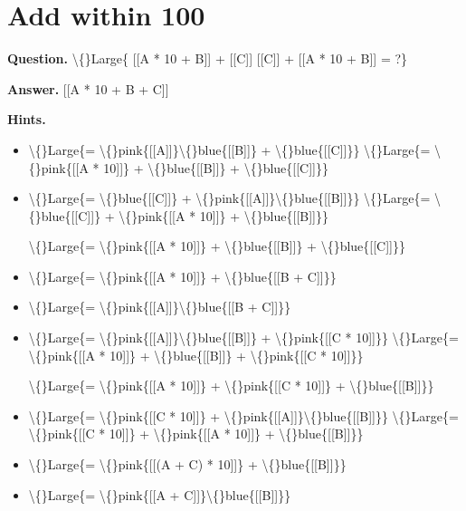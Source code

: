 \documentclass{article}
\begin{document}
\section*{Add within 100}
\textbf{Question.} \textbackslash\{\}Large\{
                        [[A * 10 + B]] + [[C]]
                        [[C]] + [[A * 10 + B]]
                    = ?\}

\textbf{Answer.} [[A * 10 + B + C]]

\textbf{Hints.}
\begin{itemize}
  \item \textbackslash\{\}Large\{= \textbackslash\{\}pink\{[[A]]\}\textbackslash\{\}blue\{[[B]]\} + \textbackslash\{\}blue\{[[C]]\}\}
                        \textbackslash\{\}Large\{= \textbackslash\{\}pink\{[[A * 10]]\} + \textbackslash\{\}blue\{[[B]]\} + \textbackslash\{\}blue\{[[C]]\}\}
  \item \textbackslash\{\}Large\{= \textbackslash\{\}blue\{[[C]]\} + \textbackslash\{\}pink\{[[A]]\}\textbackslash\{\}blue\{[[B]]\}\}
                            \textbackslash\{\}Large\{= \textbackslash\{\}blue\{[[C]]\} + \textbackslash\{\}pink\{[[A * 10]]\} + \textbackslash\{\}blue\{[[B]]\}\}
                        
                        \textbackslash\{\}Large\{= \textbackslash\{\}pink\{[[A * 10]]\} + \textbackslash\{\}blue\{[[B]]\} + \textbackslash\{\}blue\{[[C]]\}\}
  \item \textbackslash\{\}Large\{= \textbackslash\{\}pink\{[[A * 10]]\} + \textbackslash\{\}blue\{[[B + C]]\}\}
  \item \textbackslash\{\}Large\{= \textbackslash\{\}pink\{[[A]]\}\textbackslash\{\}blue\{[[B + C]]\}\}
  \item \textbackslash\{\}Large\{= \textbackslash\{\}pink\{[[A]]\}\textbackslash\{\}blue\{[[B]]\} + \textbackslash\{\}pink\{[[C * 10]]\}\}
                            \textbackslash\{\}Large\{= \textbackslash\{\}pink\{[[A * 10]]\} + \textbackslash\{\}blue\{[[B]]\} + \textbackslash\{\}pink\{[[C * 10]]\}\}
                        
                        \textbackslash\{\}Large\{= \textbackslash\{\}pink\{[[A * 10]]\} + \textbackslash\{\}pink\{[[C * 10]]\} + \textbackslash\{\}blue\{[[B]]\}\}
  \item \textbackslash\{\}Large\{= \textbackslash\{\}pink\{[[C * 10]]\} + \textbackslash\{\}pink\{[[A]]\}\textbackslash\{\}blue\{[[B]]\}\}
                        \textbackslash\{\}Large\{= \textbackslash\{\}pink\{[[C * 10]]\} + \textbackslash\{\}pink\{[[A * 10]]\} + \textbackslash\{\}blue\{[[B]]\}\}
  \item \textbackslash\{\}Large\{= \textbackslash\{\}pink\{[[(A + C) * 10]]\} + \textbackslash\{\}blue\{[[B]]\}\}
  \item \textbackslash\{\}Large\{= \textbackslash\{\}pink\{[[A + C]]\}\textbackslash\{\}blue\{[[B]]\}\}
\end{itemize}
\end{document}
